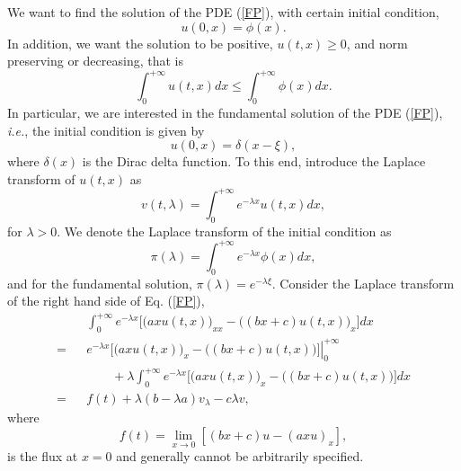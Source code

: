 \documentclass[12pt]{article}
\begin{document}
  We want to find the solution of the PDE (\ref{FP}), with certain initial condition,
  \begin{equation}
    u(0,x) = \phi(x).
    \label{init0}
  \end{equation}
  In addition, we want the solution to be positive, $u(t,x)\ge 0$, and norm preserving or decreasing, that is
  \begin{equation}
    \int_0^{+\infty}u(t,x)dx \le \int_0^{+\infty}\phi(x)dx.
  \end{equation}
  In particular, we are
  interested in the fundamental solution of the PDE (\ref{FP}), {\it i.e.}, the initial condition is given
  by
  \begin{equation}
    u(0,x)=\delta(x-\xi),
    \label{init}
  \end{equation}
  where $\delta(x)$ is the Dirac delta function. To this end, introduce the Laplace transform of $u(t,x)$ as
  \begin{equation}
    v(t,\lambda)=\int_0^{+\infty}e^{-\lambda x}u(t,x)dx,
  \end{equation}
  for $\lambda > 0$. We denote the Laplace transform of the initial condition as
  \begin{equation}
    \pi(\lambda) = \int_0^{+\infty}e^{-\lambda x}\phi(x)dx,
  \end{equation}
  and for the fundamental solution, $\pi(\lambda) = e^{-\lambda \xi}$.
  Consider the Laplace transform of the right hand side of Eq. (\ref{FP}),
  \begin{eqnarray}
      && \int_0^{+\infty} e^{-\lambda x}\bigg[\big(axu(t,x)\big)_{xx}-\big((bx+c)u(t,x)\big)_x\bigg]dx \nonumber\\
    = && \left. e^{-\lambda x}\bigg[\big(axu(t,x)\big)_{x}-\big((bx+c)u(t,x)\big)\bigg]\right|_0^{+\infty}\nonumber\\
      && \quad\quad +\lambda \int_0^{+\infty} e^{-\lambda x}\bigg[\big(axu(t,x)\big)_{x}-\big((bx+c)u(t,x)\big)\bigg]dx \nonumber\\
    = && f(t) + \lambda(b-\lambda a)v_{\lambda} - c\lambda v,
  \end{eqnarray}
  where
  \begin{equation}
    f(t) = \lim_{x\rightarrow 0}\left[(bx+c)u-(axu)_x\right],
  \end{equation}
  is the flux at $x=0$ and generally cannot be arbitrarily specified.
\end{document}
